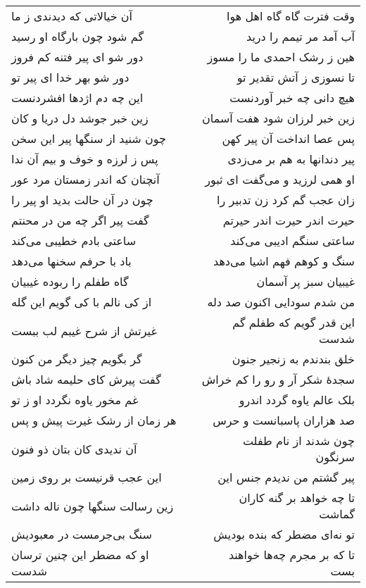 \begin{center}
\begin{longtable}{l p{0.5cm} r}
آن خیالاتی که دیدندی ز ما
&&
وقت فترت گاه گاه اهل هوا
\\
گم شود چون بارگاه او رسید
&&
آب آمد مر تیمم را درید
\\
دور شو ای پیر فتنه کم فروز
&&
هین ز رشک احمدی ما را مسوز
\\
دور شو بهر خدا ای پیر تو
&&
تا نسوزی ز آتش تقدیر تو
\\
این چه دم اژدها افشردنست
&&
هیچ دانی چه خبر آوردنست
\\
زین خبر جوشد دل دریا و کان
&&
زین خبر لرزان شود هفت آسمان
\\
چون شنید از سنگها پیر این سخن
&&
پس عصا انداخت آن پیر کهن
\\
پس ز لرزه و خوف و بیم آن ندا
&&
پیر دندانها به هم بر می‌زدی
\\
آنچنان که اندر زمستان مرد عور
&&
او همی لرزید و می‌گفت ای ثبور
\\
چون در آن حالت بدید او پیر را
&&
زان عجب گم کرد زن تدبیر را
\\
گفت پیر اگر چه من در محنتم
&&
حیرت اندر حیرت اندر حیرتم
\\
ساعتی بادم خطیبی می‌کند
&&
ساعتی سنگم ادیبی می‌کند
\\
باد با حرفم سخنها می‌دهد
&&
سنگ و کوهم فهم اشیا می‌دهد
\\
گاه طفلم را ربوده غیبیان
&&
غیبیان سبز پر آسمان
\\
از کی نالم با کی گویم این گله
&&
من شدم سودایی اکنون صد دله
\\
غیرتش از شرح غیبم لب ببست
&&
این قدر گویم که طفلم گم شدست
\\
گر بگویم چیز دیگر من کنون
&&
خلق بندندم به زنجیر جنون
\\
گفت پیرش کای حلیمه شاد باش
&&
سجدهٔ شکر آر و رو را کم خراش
\\
غم مخور یاوه نگردد او ز تو
&&
بلک عالم یاوه گردد اندرو
\\
هر زمان از رشک غیرت پیش و پس
&&
صد هزاران پاسبانست و حرس
\\
آن ندیدی کان بتان ذو فنون
&&
چون شدند از نام طفلت سرنگون
\\
این عجب قرنیست بر روی زمین
&&
پیر گشتم من ندیدم جنس این
\\
زین رسالت سنگها چون ناله داشت
&&
تا چه خواهد بر گنه کاران گماشت
\\
سنگ بی‌جرمست در معبودیش
&&
تو نه‌ای مضطر که بنده بودیش
\\
او که مضطر این چنین ترسان شدست
&&
تا که بر مجرم چه‌ها خواهند بست
\\
\end{longtable}
\end{center}
